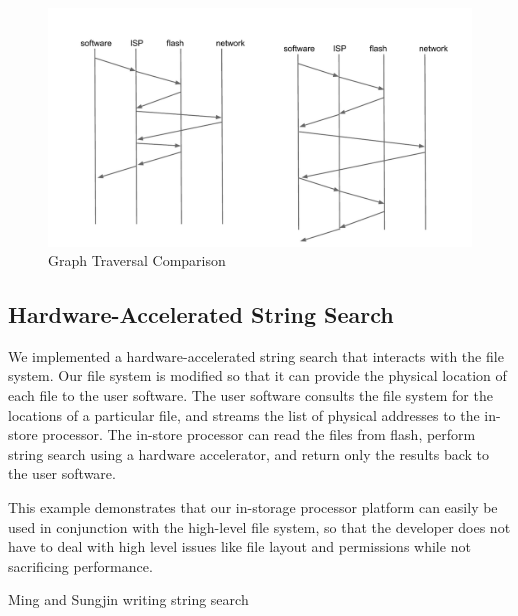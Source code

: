 \begin{figure}[h]
	\begin{center}
	\includegraphics[width=0.4\paperwidth]{figures/graph_accel.pdf}
	\caption{Graph Traversal Comparison}
	\label{fig:graph_accel}
	\end{center}
\end{figure}

\subsection{Hardware-Accelerated String Search}

We implemented a hardware-accelerated string search that interacts with the file
system. Our file system is modified so that it can provide the physical location
of each file to the user software. The user software consults the file system for the locations of a
particular file, and streams the list of physical addresses to the in-store
processor. The in-store processor can read the files from flash, perform string
search using a hardware accelerator, and return only the results back to the
user software. 

This example demonstrates that our in-storage processor platform can easily be
used in conjunction with the high-level file system, so that the developer does
not have to deal with high level issues like file layout and permissions while
not sacrificing performance.

Ming and Sungjin writing string search
